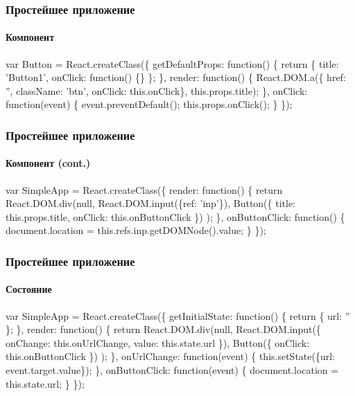 \documentclass[10pt,utf8]{beamer}
\begin{document}
\begin{frame}[fragile]
  \frametitle{Простейшее приложение}
  \framesubtitle{Компонент}

  \fontsize{9pt}{9.2}\selectfont

  \begin{semiverbatim}
    var \alert{Button} = React.createClass(\{
      getDefaultProps: function() \{
        return \{ title: 'Button1',
                 onClick: function() \{\} \};
      \},
      render: function() \{
        React.DOM.a(\{ href: '',
                      className: 'btn',
                      onClick: this.onClick\},
          this.props.title);
      \},
      onClick: function(event) \{
        event.preventDefault();
        this.props.onClick();
      \}
    \});
  \end{semiverbatim}
\end{frame}

\begin{frame}[fragile]
  \frametitle{Простейшее приложение}
  \framesubtitle{Компонент (cont.)}

  \begin{semiverbatim}
    var SimpleApp = React.createClass(\{
      render: function() \{
        return React.DOM.div(null,
          React.DOM.input(\{ref: 'inp'\}),
          \alert{Button(\{ title: this.props.title,
                   onClick: \alert{this.onButtonClick} \})}
        );
      \},
      onButtonClick: function() \{
        document.location = this.refs.inp.getDOMNode().value;
      \}
    \});
  \end{semiverbatim}
\end{frame}

\begin{frame}[fragile]
  \frametitle{Простейшее приложение}
  \framesubtitle{Состояние}

  \fontsize{9pt}{9.2}\selectfont

  \begin{semiverbatim}
    var SimpleApp = React.createClass(\{
      getInitialState: function() \{
        return \{ \alert{url: ''} \};
      \},
      render: function() \{
        return React.DOM.div(null,
          React.DOM.input(\{ onChange: this.onUrlChange,
                            value: \alert{this.state.url} \}),
          Button(\{ onClick: this.onButtonClick \})
        );
      \},
      onUrlChange: function(event) \{
        \alert{this.setState(\{url: event.target.value\});}
      \},
      onButtonClick: function(event) \{
        document.location = \alert{this.state.url};
      \}
    \});
  \end{semiverbatim}
\end{frame}
\end{document}
